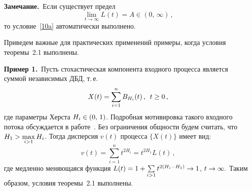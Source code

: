 \begin{multicols}{2}
\smallskip

\noindent
\textbf{Замечание.}\ Если существует предел
\begin{equation}
\lim\limits_{t\to \infty} L(t)= A\in (0,\,\infty)\,,
\label{38}
\end{equation}
то
условие~\eqref{10a} автоматически вы\-пол\-нено.

\smallskip

Приведем важные для практических применений примеры, когда условия
теоремы~2.1 вы\-пол\-нены.

\smallskip

\noindent
\textbf{Пример 1.}\ Пусть стохастическая компонента входного
процесса является суммой независимых ДБД, т.\,е.
\begin{equation*}
X(t)=\sum\limits_{i=1}^n B_{H_i}(t)\,, \enskip t\ge 0\,,
\end{equation*}
где параметры Херста $H_i\hm\in (0,\,1)$. Подробная мотивировка такого
входного потока обсуждается  в работе~\cite{Taqqu}.  Без ограничения
общности будем считать, что $H_1\hm>\max\limits_{i>1}H_i$. Тогда
 дисперсия $v(t)$  процесса $\{X(t)\}$  имеет вид:
$$
v(t)=\sum\limits_{i=1}^n t^{2H_i}=t^{2H_1}L(t)\,,
$$
где медленно меняющаяся функция $ L(t)\hm=1\hm+\sum\limits_{i>1}
t^{2(H_i-H_1)}\hm\to 1$, $t \hm\to \infty. $ Таким образом, условия
теоремы~2.1 выполнены.

\smallskip


\end{multicols}
